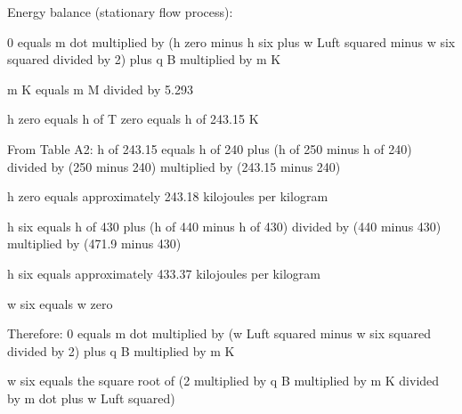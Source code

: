 Energy balance (stationary flow process):  

0 equals m dot multiplied by (h zero minus h six plus w Luft squared minus w six squared divided by 2) plus q B multiplied by m K  

m K equals m M divided by 5.293  

h zero equals h of T zero equals h of 243.15 K  

From Table A2:  
h of 243.15 equals h of 240 plus (h of 250 minus h of 240) divided by (250 minus 240) multiplied by (243.15 minus 240)  

h zero equals approximately 243.18 kilojoules per kilogram  

h six equals h of 430 plus (h of 440 minus h of 430) divided by (440 minus 430) multiplied by (471.9 minus 430)  

h six equals approximately 433.37 kilojoules per kilogram  

w six equals w zero  

Therefore:  
0 equals m dot multiplied by (w Luft squared minus w six squared divided by 2) plus q B multiplied by m K  

w six equals the square root of (2 multiplied by q B multiplied by m K divided by m dot plus w Luft squared)